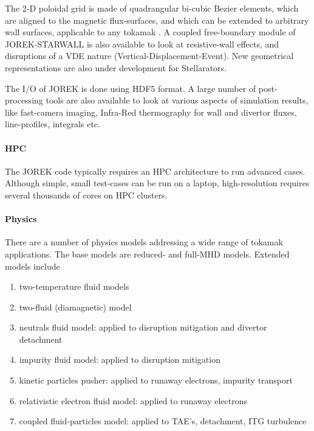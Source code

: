 The 2-D poloidal grid is made of quadrangular bi-cubic Bezier elements, which 
are aligned to the magnetic flux-surfaces, and which can be extended to 
arbitrary wall surfaces, applicable to any tokamak \cite{Pamela2019}. A coupled 
free-boundary module of JOREK-STARWALL \cite{Hoelzl2012,Artola2018,Artola2020} 
is also available to look at resistive-wall effects, and disruptions of a VDE 
nature (Vertical-Displacement-Event). New geometrical representations are also 
under development for Stellarators.

The I/O of JOREK is done using HDF5 format. A large number of post-processing 
tools are also available to look at various aspects of simulation results, like 
fast-camera imaging, Infra-Red thermography for wall and divertor fluxes, 
line-profiles, integrals etc.

\paragraph{HPC}

The JOREK code typically requires an HPC architecture to run advanced cases. 
Although simple, small test-cases can be run on a laptop, high-resolution 
requires several thousands of cores on HPC clusters.

\paragraph{Physics}

There are a number of physics models addressing a wide range of tokamak 
applications. The base models are reduced- and full-MHD models. Extended models 
include
\begin{enumerate}
    \item two-temperature fluid models
    \item two-fluid (diamagnetic) model
    \item neutrals fluid model: applied to disruption mitigation and divertor 
detachment
    \item impurity fluid model: applied to disruption mitigation
    \item kinetic particles pusher: applied to runaway electrons, impurity 
transport
    \item relativistic electron fluid model: applied to runaway electrons
    \item coupled fluid-particles model: applied to TAE's, detachment, ITG 
turbulence
\end{enumerate}

